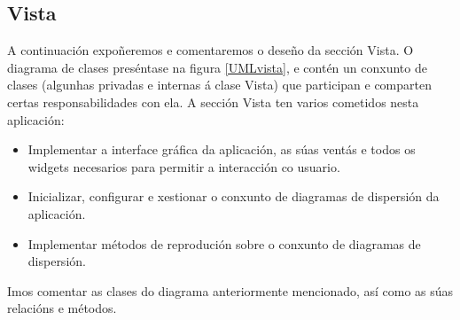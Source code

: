 \subsection{Vista}

A continuación expoñeremos e comentaremos o deseño da sección Vista. O diagrama de clases preséntase na figura \ref{UMLvista}, e contén un conxunto de clases (algunhas privadas e internas á clase Vista) que participan e comparten certas responsabilidades con ela. A sección Vista ten varios cometidos nesta aplicación:

\begin{itemize}
\item Implementar a interface gráfica da aplicación, as súas ventás e todos os widgets necesarios para permitir a interacción co usuario.
\item Inicializar, configurar e xestionar o conxunto de diagramas de dispersión da aplicación. 
\item Implementar métodos de reprodución sobre o conxunto de diagramas de dispersión.
\end{itemize}

Imos comentar as clases do diagrama anteriormente mencionado, así como as súas relacións e métodos.

